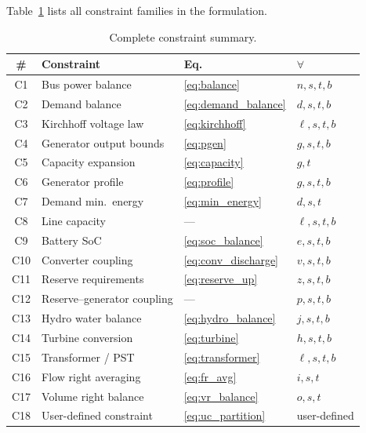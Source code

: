 Table~\ref{tab:constraints} lists all constraint families in the
formulation.

\begin{table}[t]
\centering
\caption{Complete constraint summary.}
\label{tab:constraints}
\small
\begin{tabular}{@{}clll@{}}
\toprule
\textbf{\#} & \textbf{Constraint} & \textbf{Eq.} & $\boldsymbol{\forall}$ \\
\midrule
C1  & Bus power balance             & \eqref{eq:balance}          & $n,s,t,b$ \\
C2  & Demand balance                & \eqref{eq:demand_balance}   & $d,s,t,b$ \\
C3  & Kirchhoff voltage law         & \eqref{eq:kirchhoff}        & $\ell,s,t,b$ \\
C4  & Generator output bounds       & \eqref{eq:pgen}             & $g,s,t,b$ \\
C5  & Capacity expansion            & \eqref{eq:capacity}         & $g,t$ \\
C6  & Generator profile             & \eqref{eq:profile}          & $g,s,t,b$ \\
C7  & Demand min.\ energy           & \eqref{eq:min_energy}       & $d,s,t$ \\
C8  & Line capacity                 & ---                         & $\ell,s,t,b$ \\
C9  & Battery SoC                   & \eqref{eq:soc_balance}      & $e,s,t,b$ \\
C10 & Converter coupling            & \eqref{eq:conv_discharge}   & $v,s,t,b$ \\
C11 & Reserve requirements          & \eqref{eq:reserve_up}       & $z,s,t,b$ \\
C12 & Reserve--generator coupling   & ---                         & $p,s,t,b$ \\
C13 & Hydro water balance           & \eqref{eq:hydro_balance}    & $j,s,t,b$ \\
C14 & Turbine conversion            & \eqref{eq:turbine}          & $h,s,t,b$ \\
C15 & Transformer / PST             & \eqref{eq:transformer}      & $\ell,s,t,b$ \\
C16 & Flow right averaging          & \eqref{eq:fr_avg}           & $i,s,t$ \\
C17 & Volume right balance          & \eqref{eq:vr_balance}       & $o,s,t$ \\
C18 & User-defined constraint       & \eqref{eq:uc_partition}     & user-defined \\

\end{tabular}
\end{table}
